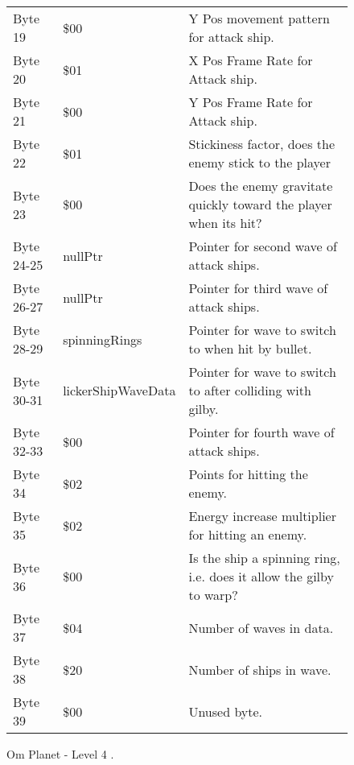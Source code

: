 \begin{figure}[H]
{\begin{adjustbox}{width=12cm}
\begin{tabular}{lll}
 Byte 19    & \$00                       & Y Pos movement pattern for attack ship.                             \\
 Byte 20    & \$01                       & X Pos Frame Rate for Attack ship.                                   \\
 Byte 21    & \$00                       & Y Pos Frame Rate for Attack ship.                                   \\
 Byte 22    & \$01                       & Stickiness factor, does the enemy stick to the player               \\
 Byte 23    & \$00                       & Does the enemy gravitate quickly toward the player when its hit?    \\
 Byte 24-25 & nullPtr                   & Pointer for second wave of attack ships.                            \\
 Byte 26-27 & nullPtr                   & Pointer for third wave of attack ships.                             \\
 Byte 28-29 & spinningRings             & Pointer for wave to switch to when hit by bullet.                   \\
 Byte 30-31 & lickerShipWaveData        & Pointer for  wave to switch to after colliding with gilby.          \\
 Byte 32-33 & \$00                       & Pointer for fourth wave of attack ships.                            \\
 Byte 34    & \$02                       & Points for hitting the enemy.                                       \\
 Byte 35    & \$02                       & Energy increase multiplier for hitting an enemy.                    \\
 Byte 36    & \$00                       & Is the ship a spinning ring, i.e. does it allow the gilby to warp?  \\
 Byte 37    & \$04                       & Number of waves in data.                                            \\
 Byte 38    & \$20                       & Number of ships in wave.                                            \\
 Byte 39    & \$00                       & Unused byte.                                                        \\
\bottomrule
\end{tabular}

  \end{adjustbox}

  }\caption*{Om Planet - Level 4
.}
\end{figure}

